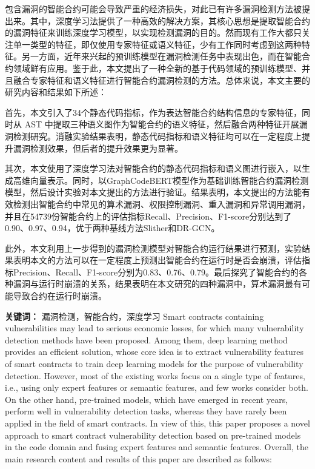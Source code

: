 \cleardoublepage
{}
包含漏洞的智能合约可能会导致严重的经济损失，对此已有许多漏洞检测方法被提出来。其中，深度学习法提供了一种高效的解决方案，其核心思想是提取智能合约的漏洞特征来训练深度学习模型，以实现检测漏洞的目的。然而现有工作大都只关注单一类型的特征，即仅使用专家特征或语义特征，少有工作同时考虑到这两种特征。另一方面，近年来兴起的预训练模型在漏洞检测任务中表现出色，而在智能合约领域鲜有应用。鉴于此，本文提出了一种全新的基于代码领域的预训练模型、并且融合专家特征和语义特征进行智能合约漏洞检测的方法。总体来说，本文主要的研究内容和结果如下所述：

首先，本文引入了34个静态代码指标，作为表达智能合约结构信息的专家特征，同时从 AST 中提取三种语义图作为智能合约的语义特征，然后融合两种特征开展漏洞检测研究。消融实验结果表明，静态代码指标和语义特征均可以在一定程度上提升漏洞检测效果，但后者的提升效果更为显著。

其次，本文使用了深度学习法对智能合约的静态代码指标和语义图进行嵌入，以生成高维向量表示。同时，以GraphCodeBERT模型作为基础训练智能合约漏洞检测模型，然后设计实验对本文提出的方法进行验证。结果表明，本文提出的方法能有效检测出智能合约中常见的算术漏洞、权限控制漏洞、重入漏洞和异常调用漏洞，并且在\num{54739}份智能合约上的评估指标Recall、Precision、F1-score分别达到了0.90、0.97、0.94，优于两种基线方法Slither和DR-GCN。
    
此外，本文利用上一步得到的漏洞检测模型对智能合约运行结果进行预测，实验结果表明本文的方法可以在一定程度上预测出智能合约在运行时是否会崩溃，评估指标Precision、Recall、F1-score分别为0.83、0.76、0.79。最后探究了智能合约的各种漏洞与运行时崩溃的关系，结果表明在本文研究的四种漏洞中，算术漏洞最有可能导致合约在运行时崩溃。


\hspace*{\fill}

\noindent \textbf{关键词：} 漏洞检测，智能合约，深度学习
\cleardoublepage
{}
Smart contracts containing vulnerabilities may lead to serious economic losses, for which many vulnerability detection methods have been proposed. Among them, deep learning method provides an efficient solution, whose core idea is to extract vulnerability features of smart contracts to train deep learning models for the purpose of vulnerability detection. However, most of the existing works focus on a single type of features, i.e., using only expert features or semantic features, and few works consider both. On the other hand, pre-trained models, which have emerged in recent years, perform well in vulnerability detection tasks, whereas they have rarely been applied in the field of smart contracts. In view of this, this paper proposes a novel approach to smart contract vulnerability detection based on pre-trained models in the code domain and fusing expert features and semantic features. Overall, the main research content and results of this paper are described as follows:

